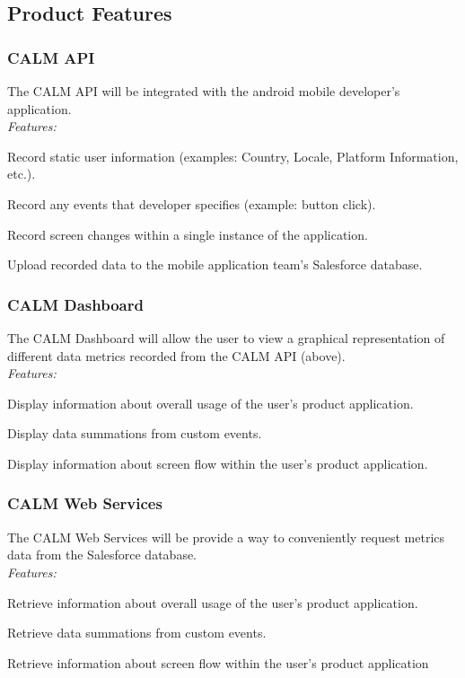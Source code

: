 \documentclass[12pt,oneside,letterpaper]{article}
\newenvironment{packed_enumerate}{ %
\vspace{-7mm}
\begin{enumerate}
  \setlength{\itemsep}{0pt}
  \setlength{\parskip}{0pt}
  \setlength{\parsep}{0pt}
}{\end{enumerate}
\vspace{-8mm}}
\begin{document}
\subsection{Product Features}
\subsubsection{CALM API}
The CALM API will be integrated with the android mobile developer's 
application.\\
\textit{Features:}\\
\begin{packed_enumerate}
\item Record static user information (examples: Country, Locale, 
Platform Information, etc.).
\item Record any events that developer specifies (example: button 
click).
\item Record screen changes within a single instance of the 
application.
\item Upload recorded data to the mobile application team's Salesforce 
database.
\end{packed_enumerate}
\pagebreak
\subsubsection{CALM Dashboard}
The CALM Dashboard will allow the user to view a graphical 
representation of different data metrics recorded from the CALM API 
(above).\\
\textit{Features:}\\
\begin{packed_enumerate}
\item Display information about overall usage of the user's product 
application.
\item Display data summations from custom events.
\item Display information about screen flow within the user's product 
application.
\end{packed_enumerate}

\subsubsection{CALM Web Services}
The CALM Web Services will be provide a way to conveniently request metrics data from the Salesforce database.\\
\textit{Features:}\\
\begin{packed_enumerate}
\item Retrieve information about overall usage of the user's product application.
\item Retrieve data summations from custom events.
\item Retrieve information about screen flow within the user's product application
\end{packed_enumerate}
\end{document}
